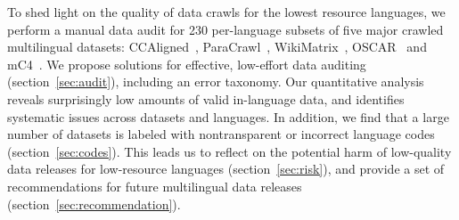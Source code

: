 To shed light on the quality of data crawls for the lowest resource languages, we perform a manual data audit for 230 per-language subsets of five major crawled multilingual datasets: CCAligned~\citep{el-kishky-etal-2020-ccaligned}, ParaCrawl~\citep{espla-etal-2019-paracrawl,banon-etal-2020-paracrawl}, WikiMatrix~\citep{schwenk-etal-2021-wikimatrix}, OSCAR~\citep{ortiz-suarez-etal-2019-asynchronous, ortiz-suarez-etal-2020-monolingual} and mC4~\citep{xue-etal-2021-mt5}. We propose solutions for effective, low-effort data auditing (section~\ref{sec:audit}), including an error taxonomy. Our quantitative analysis reveals surprisingly low amounts of valid in-language data, and identifies systematic issues across datasets and languages. In addition, we find that a large number of datasets is labeled with nontransparent or incorrect language codes (section~\ref{sec:codes}). This leads us to reflect on the potential harm of low-quality data releases for low-resource languages (section~\ref{sec:risk}), and provide a set of recommendations for future multilingual data releases (section~\ref{sec:recommendation}).


